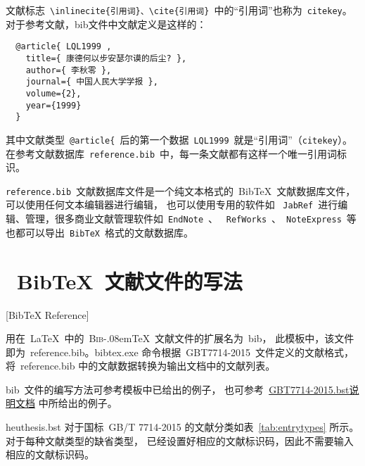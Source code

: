 文献标志~\verb|\inlinecite{引用词}、\cite{引用词}|~中的“引用词”也称为~\verb|citekey|。
对于参考文献\cite{OJP1999}，bib文件中文献定义是这样的：
\begin{lstlisting}
  @article{ LQL1999 ,
    title={ 康德何以步安瑟尔谟的后尘? },
    author={ 李秋零 },
    journal={ 中国人民大学学报 },
    volume={2},
    year={1999}
  }
\end{lstlisting}

其中文献类型~\verb|@article{|~后的第一个数据~\verb|LQL1999|~就是“引用词”（\verb|citekey|）。
在参考文献数据库~\texttt{reference.bib}~中，每一条文献都有这样一个唯一引用词标识。

\texttt{reference.bib}~文献数据库文件是一个纯文本格式的~BibTeX~文献数据库文件，可以使用任何文本编辑器进行编辑，
也可以使用专用的软件如 ~\texttt{JabRef}~进行编辑、管理，很多商业文献管理软件如~\texttt{EndNote}~、
~\texttt{RefWorks}~、~\texttt{NoteExpress}~等也都可以导出~\texttt{BibTeX}~格式的文献数据库。

\section{~BibTeX~文献文件的写法}[BibTeX Reference]

用在~\LaTeX~中的~\textsc{Bib}\kern-.08em\TeX~文献文件的扩展名为~bib，
此模板中，该文件即为~reference.bib。bibtex.exe 命令根据~GBT7714-2015~文件定义的文献格式，
将~reference.bib 中的文献数据转换为输出文档中的文献列表。

bib~文件的编写方法可参考模板中已给出的例子，
也可参考~\href{http://bbs.ctex.org/attachment.php?aid=MTk3OTd8NjY1ODc5OGV8MTMyNTY0MTEyMnxhZGZkYWpsa0I2RGZwNDR5Z1lyeStjb1dKRS8rTnJub3lvT2FkNDNJbHl1UWVkVQ\%3D\%3D}{GBT7714-2015.bst说明文档} 中所给出的例子。


heuthesis.bst 对于国标~GB/T 7714-2015 的文献分类如表~\ref{tab:entrytypes} 所示。对于每种文献类型的缺省类型，
已经设置好相应的文献标识码，因此不需要输入相应的文献标识码。

